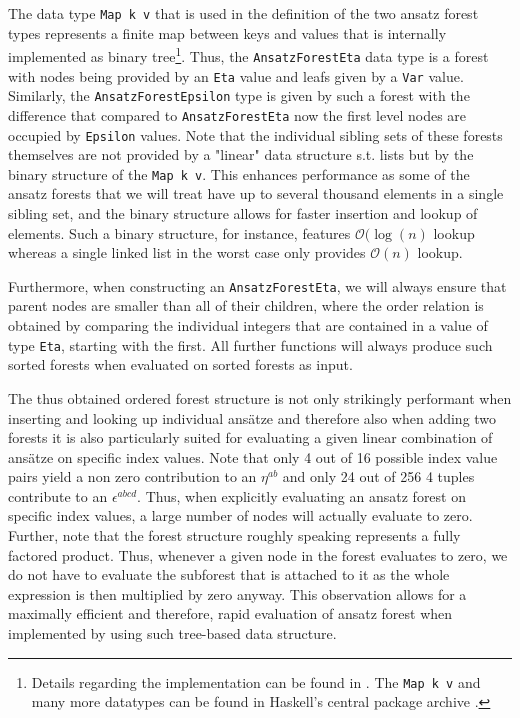 The data type \texttt{Map k v} that is used in the definition of the two ansatz forest types represents a finite map between keys and values that is internally implemented as binary tree\footnote{Details regarding the implementation can be found in \cite{adams_1993}. The \texttt{Map k v} \cite{HackageMap} and many more datatypes can be found in Haskell's central package archive \cite{Hackage}.}. Thus, the \texttt{AnsatzForestEta} data type is a forest with nodes being provided by an \texttt{Eta} value and leafs given by a \texttt{Var} value. Similarly, the \texttt{AnsatzForestEpsilon} type is given by such a forest with the difference that compared to \texttt{AnsatzForestEta} now the first level nodes are occupied by \texttt{Epsilon} values. Note that the individual sibling sets of these forests themselves are not provided by a "linear" data structure s.t. lists but by the binary structure of the \texttt{Map k v}. This enhances performance as some of the ansatz forests that we will treat have up to several thousand elements in a single sibling set, and the binary structure allows for faster insertion and lookup of elements. Such a binary structure, for instance, features $\mathcal{O}(\operatorname{log}(n)$ lookup whereas a single linked list in the worst case only provides $\mathcal{O}(n)$ lookup. 

Furthermore, when constructing an \texttt{AnsatzForestEta}, we will always ensure that parent nodes are smaller than all of their children, where the order relation is obtained by comparing the individual integers that are contained in a value of type \texttt{Eta}, starting with the first. All further functions will always produce such sorted forests when evaluated on sorted forests as input. 

The thus obtained ordered forest structure is not only strikingly performant when inserting and looking up individual ansätze and therefore also when adding two forests it is also particularly suited for evaluating a given linear combination of ansätze on specific index values. Note that only 4 out of 16 possible index value pairs yield a non zero contribution to an $\eta^{ab}$ and only 24 out of 256 4 tuples contribute to an $\epsilon^{abcd}$. Thus, when explicitly evaluating an ansatz forest on specific index values, a large number of nodes will actually evaluate to zero. Further, note that the forest structure roughly speaking represents a fully factored product. Thus, whenever a given node in the forest evaluates to zero, we do not have to evaluate the subforest that is attached to it as the whole expression is then multiplied by zero anyway. This observation allows for a maximally efficient and therefore, rapid evaluation of ansatz forest when implemented by using such tree-based data structure. 

